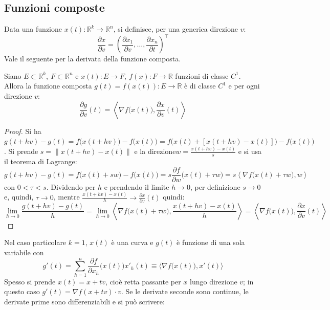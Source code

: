 \documentclass[11pt, a4paper]{scrartcl}
\theoremstyle{definition}
\numberwithin{esempio}{section}
\theoremstyle{definition}
\numberwithin{obs}{section}
\numberwithin{nota}{section}
\numberwithin{equation}{subsection}
\begin{document}
\subsection{Funzioni composte}
	Data una funzione $x(t) : \mathbb{R}^k \to \mathbb{R}^n$, si definisce, per una generica direzione $v$:
	\begin{equation}
		\frac{\partial x}{\partial v} = \left(\frac{\partial x_1}{\partial v}, \ldots , \frac{\partial x_n}{\partial t}  \right) ^\top
	\end{equation}
Vale il seguente per la derivata della funzione composta.
\begin{teorema}
	{}{}
	Siano $E \subset  \mathbb{R}^k , \ F \subset \mathbb{R}^n$ e $x(t) : E \to F , \ f(x) : F \to \mathbb{R}$ funzioni di classe $C^1$. Allora la funzione composta $g(t) = f(x(t)) : E \to\mathbb{R}$ \`e di classe $C^1$ e per ogni direzione $v$:
	\begin{equation}
		\frac{\partial g}{\partial v} (t) =\left\langle \nabla f\big(x(t)\big), \frac{\partial x}{\partial v} (t) \right\rangle
	\end{equation}
	\begin{proof}
		Si ha $g(t + h v) -g(t) = f\big(x(t+hv)\big) - f\big(x(t)\big) = f\big(x(t) + [x(t+hv) - x(t)]\big) - f\big(x(t)\big)$. Si prende $s = \lVert x(t+hv) - x(t) \rVert $ e la direzione$w = \frac{x(t+hv) - x(t)}{s}$ e si usa il teorema di Lagrange:
		\[
		g(t+hv) - g(t) = f\big(x(t) + s w\big) - f\big(x(t)\big) = s \frac{\partial f}{\partial w} \big(x(t) + \tau w\big) = s \left\langle \nabla f \big(x(t) + \tau  w\big), w \right\rangle
		\] 
	con $0<\tau <s$. Dividendo per $h$ e prendendo il limite $h\to 0$, per definizione $s \to 0$ e, quindi, $\tau  \to 0$, mentre $\frac{x(t+hv) - x(t)}{h}\to \frac{\partial x}{\partial v} (t)$ quindi:
\[
\lim_{h \to 0} \frac{g(t+ hv) -g(t)}{h} = \lim_{h \to 0} \left\langle \nabla f\big(x(t) + \tau  w\big), \frac{x(t+hv) - x(t)}{h} \right\rangle = \left\langle\nabla f\big(x(t)\big), \frac{\partial x}{\partial v} (t)  \right\rangle
\] 
	\end{proof}
\end{teorema}
\noindent Nel caso particolare $k=1$, $x(t)$ \`e una curva e $g(t)$ \`e funzione di una sola variabile con
\[
g'(t) = \sum_{h=1}^{n} \frac{\partial f}{\partial x_h} \big(x(t)\big) x'_h(t) \equiv \Big\langle \nabla f \big(x(t)\big), x'(t) \Big\rangle
\] 
Spesso si prende $x(t) = x + t v $, cio\`e retta passante per $x$ lungo direzione $v$; in questo caso $g'(t) = \nabla f(x+tv) \cdot  v$. Se le derivate seconde sono continue, le derivate prime sono differenziabili e si pu\`o scrivere:
\end{document}
